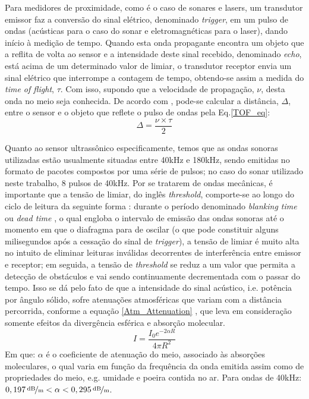 Para medidores de proximidade, como é o caso de sonares e lasers, um transdutor emissor faz a conversão do sinal elétrico, denominado 
\textit{trigger}, em um pulso de ondas (acústicas para o caso do sonar e eletromagnéticas para o laser), dando início à medição de tempo.
Quando esta onda propagante encontra um objeto que a reflita de volta ao sensor e a intensidade deste sinal recebido, denominado \textit{echo}, está 
acima de um determinado valor de limiar, o transdutor receptor envia um sinal elétrico que interrompe a contagem de tempo, obtendo-se 
assim a medida do \textit{time of flight}, $\tau$.
Com isso, supondo que a velocidade de propagação, $\nu$, desta onda no meio seja conhecida. De acordo com , pode-se 
calcular a distância, $\Delta$, entre o sensor e o objeto que reflete o pulso de ondas pela Eq.\ref{TOF_eq}:
\begin{equation}
 \label{TOF_eq}
 \Delta = \frac{\nu \times \tau }{2}
\end{equation}

Quanto ao sensor ultrassônico especificamente, temos que as ondas sonoras utilizadas estão usualmente situadas entre 40kHz e 180kHz, sendo 
emitidas no formato de pacotes compostos por uma série de pulsos; no caso do sonar utilizado neste trabalho, 8 pulsos de 40kHz. 
Por se tratarem de ondas mecânicas, é importante que a tensão de limiar, do inglês \textit{threshold}, comporte-se ao longo do ciclo de 
leitura da seguinte forma \cite{siegwart}: 
durante o período denominado \textit{blanking time} \cite{siegwart}  ou \textit{dead time} \cite{murphy}, o qual engloba o intervalo de 
emissão das ondas sonoras até o momento em que o diafragma para de oscilar (o que pode constituir alguns milisegundos após a cessação do sinal de 
\textit{trigger}), a tensão de limiar é muito alta no intuito de eliminar leituras inválidas decorrentes de interferência entre emissor e receptor; em 
seguida, a tensão de \textit{threshold} se reduz a um valor que permita a detecção de obstáculos e vai sendo continuamente decrementada com o passar 
do tempo. 
Isso se dá pelo fato de que a intensidade do sinal acústico, i.e. potência por ângulo sólido, sofre atenuações atmosféricas que variam com a 
distância percorrida, conforme a equação \ref{Atm_Attenuation} \cite{everett}, que leva em consideração somente efeitos da divergência esférica e 
absorção molecular.
\begin{equation}
 \label{Atm_Attenuation}
 I = \frac{ I_0 e^{-2 \alpha R} }{4 \pi R^2}
\end{equation}
Em que: $\alpha$ é o coeficiente de atenuação do meio, associado às absorções moleculares, o qual varia em função da frequência da onda emitida 
assim como de propriedades do meio, e.g. umidade e poeira contida no ar.
Para ondas de 40kHz: $\unitfrac[0,197]{dB}{m} < \alpha <  \unitfrac[0,295]{dB}{m}$. %

